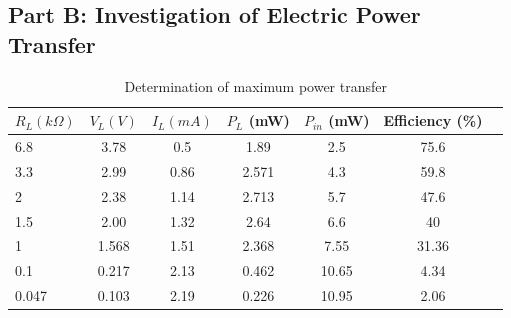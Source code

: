 \documentclass{article}
\begin{document}
\vspace{1cm}

\subsection{Part B: Investigation of Electric Power Transfer }
\label{sub:Part B}
      
  
  
      \begin{table}[!ht]
  \captionsetup{font=large}
  \centering
  \caption{ Determination of maximum power transfer }
  \label{tab:maxpower}
  \begin{tabular}{   | l | c | c | c | c | c | r | }
  \hline

      $R_L(k \Omega)$ &     $V_L(V)$ &     $I_L(mA)$ &    $P_L$ (mW) &    $P_{in}$ (mW) &    Efficiency (\%)     \\ \hline
      6.8 &    3.78 &    0.5 &    1.89 &    2.5 &    75.6     \\ \hline
      3.3 &    2.99 &    0.86 &    2.571 &    4.3 &    59.8     \\ \hline
      2 &    2.38 &    1.14 &    2.713 &    5.7 &    47.6     \\ \hline
      1.5 &     2.00 &    1.32 &    2.64 &    6.6 &    40     \\ \hline
      1 &     1.568 &    1.51 &    2.368 &    7.55 &    31.36     \\ \hline
      0.1 &     0.217 &     2.13 &    0.462 &    10.65 &    4.34     \\ \hline
      0.047 &     0.103 &     2.19 &    0.226 &    10.95 &    2.06     \\ \hline
  
  \end{tabular}
  \end{table}
\end{document}
